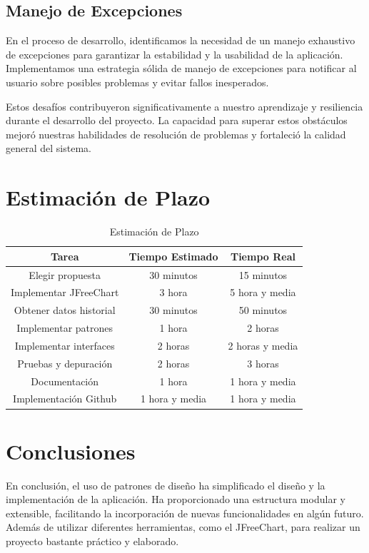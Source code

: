 \documentclass{article}
\begin{document}
\subsection{Manejo de Excepciones}
En el proceso de desarrollo, identificamos la necesidad de un manejo exhaustivo de excepciones para garantizar la estabilidad y la usabilidad de la aplicación. Implementamos una estrategia sólida de manejo de excepciones para notificar al usuario sobre posibles problemas y evitar fallos inesperados.

Estos desafíos contribuyeron significativamente a nuestro aprendizaje y resiliencia durante el desarrollo del proyecto. La capacidad para superar estos obstáculos mejoró nuestras habilidades de resolución de problemas y fortaleció la calidad general del sistema.

\section{Estimación de Plazo}
\begin{table}[H]
  \centering
  \caption{Estimación de Plazo}
  \begin{tabular}{|c|c|c|}
    \hline
    \textbf{Tarea} & \textbf{Tiempo Estimado} & \textbf{Tiempo Real} \\
    \hline
    Elegir propuesta & 30 minutos & 15 minutos \\
    Implementar JFreeChart & 3 hora & 5 hora y media \\
    Obtener datos historial & 30 minutos & 50 minutos \\
    Implementar patrones & 1 hora & 2 horas \\
    Implementar interfaces & 2 horas & 2 horas y media \\
    Pruebas y depuración & 2 horas & 3 horas \\
    Documentación & 1 hora & 1 hora y media \\
    Implementación Github & 1 hora y media & 1 hora y media \\
    \hline
  \end{tabular}
  \label{Estimación de Plazo}
\end{table}

\section{Conclusiones}
En conclusión, el uso de patrones de diseño ha simplificado el diseño y la implementación de la aplicación. Ha proporcionado una estructura modular y extensible, facilitando la incorporación de nuevas funcionalidades en algún futuro. Además de utilizar diferentes herramientas, como el JFreeChart, para realizar un proyecto bastante práctico y elaborado.
\end{document}
